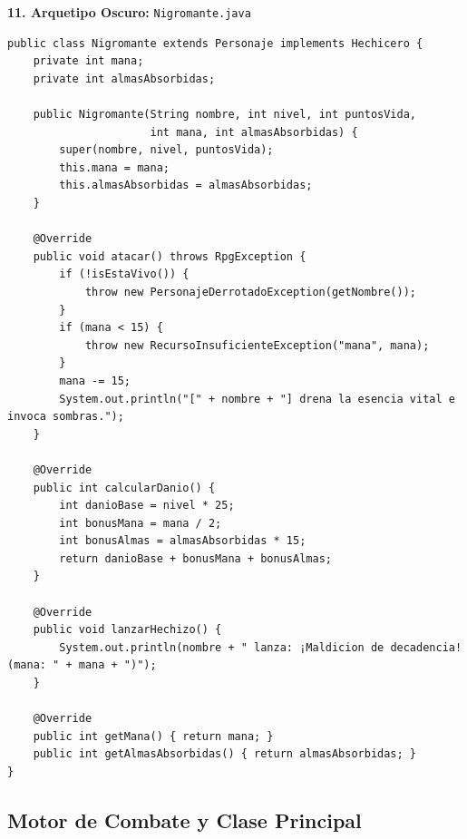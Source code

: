 \documentclass[11pt,letterpaper]{article}
\begin{document}
\textbf{11. Arquetipo Oscuro:} \texttt{Nigromante.java}
\begin{lstlisting}[style=JavaStyle]
public class Nigromante extends Personaje implements Hechicero {
    private int mana;
    private int almasAbsorbidas;

    public Nigromante(String nombre, int nivel, int puntosVida,
                      int mana, int almasAbsorbidas) {
        super(nombre, nivel, puntosVida);
        this.mana = mana;
        this.almasAbsorbidas = almasAbsorbidas;
    }

    @Override
    public void atacar() throws RpgException {
        if (!isEstaVivo()) {
            throw new PersonajeDerrotadoException(getNombre());
        }
        if (mana < 15) {
            throw new RecursoInsuficienteException("mana", mana);
        }
        mana -= 15;
        System.out.println("[" + nombre + "] drena la esencia vital e invoca sombras.");
    }

    @Override
    public int calcularDanio() {
        int danioBase = nivel * 25;
        int bonusMana = mana / 2;
        int bonusAlmas = almasAbsorbidas * 15;
        return danioBase + bonusMana + bonusAlmas;
    }

    @Override
    public void lanzarHechizo() {
        System.out.println(nombre + " lanza: ¡Maldicion de decadencia! (mana: " + mana + ")");
    }

    @Override
    public int getMana() { return mana; }
    public int getAlmasAbsorbidas() { return almasAbsorbidas; }
}
\end{lstlisting}

\subsection{Motor de Combate y Clase Principal}
\end{document}
